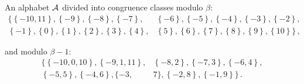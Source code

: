 \begin{exmp}
\label{ex:integerAR}

An alphabet $\mathcal{A}$ divided into congruence classes modulo $\beta$: 
\begin{align*}
\{\left\{-10, 11\right\}, \left\{-9\right\}, \left\{-8\right\}, \left\{-7\right\},& \left\{-6\right\}, \left\{-5\right\}, \left\{-4\right\}, \left\{-3\right\}, \left\{-2\right\},  \\
\left\{-1\right\}, \left\{0\right\}, \left\{1\right\}, \left\{2\right\}, \left\{3\right\}, \left\{4\right\},& \left\{5\right\}, \left\{6\right\}, \left\{7\right\}, \left\{8\right\}, \left\{9\right\}, \left\{10\right\}\} \,,
\end{align*}

and modulo $\beta - 1$: \begin{align*} 
\{\left\{-10, 0, 10\right\}, \left\{-9, 1, 11\right\},& \left\{-8, 2\right\}, \left\{-7, 3\right\}, \left\{-6, 4\right\}, \\
 \left\{-5, 5\right\}, \left\{-4, 6\right\}, \{-3,\, & 7\}, \left\{-2, 8\right\}, \left\{-1, 9\right\}\} \,.
 \end{align*}

\end{exmp}


